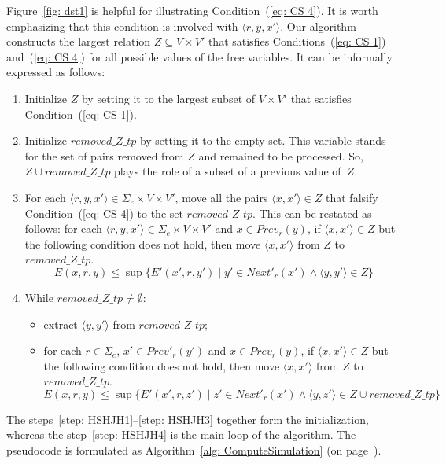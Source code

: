 \documentclass[11pt]{article}
\def\tuple#1{\langle#1\rangle}
\def\eqref#1{(\ref{#1})}
\newcommand{\SE}{\Sigma_e}
\newcommand{\Prev}{\mathit{Prev}}
\newcommand{\NextP}{\mathit{Next}'}
\newcommand{\PrevP}{\mathit{Prev}'}
\newcommand{\removeZ}{\textit{removed\_Z\_tp}}
\begin{document}
Figure~\ref{fig: dst1} is helpful for illustrating Condition~\eqref{eq: CS 4}. It is worth emphasizing that this condition is involved with $\tuple{r,y,x'}$. Our algorithm constructs the largest relation $Z \subseteq V \times V'$ that satisfies Conditions~\eqref{eq: CS 1} and~\eqref{eq: CS 4} for all possible values of the free variables. 
%
It can be informally expressed as follows:
\begin{enumerate}
\item\label{step: HSHJH1} Initialize $Z$ by setting it to the largest subset of $V \times V'$ that satisfies Condition~\eqref{eq: CS 1}. 
\item Initialize $\removeZ$ by setting it to the empty set. This variable stands for the set of pairs removed from $Z$ and remained to be processed. So, $Z \cup \removeZ$ plays the role of a subset of a previous value of~$Z$. 

\item\label{step: HSHJH3} For each $\tuple{r,y,x'} \in \SE \times V \times V'$, move all the pairs $\tuple{x,x'} \in Z$ that falsify Condition~\eqref{eq: CS 4} to the set $\removeZ$. This can be restated as follows: for each $\tuple{r,y,x'} \in \SE \times V \times V'$ and $x \in \Prev_r(y)$, if $\tuple{x,x'} \in Z$ but the following condition does not hold, then move $\tuple{x,x'}$ from $Z$ to $\removeZ$. 
\begin{equation}\label{eq: CS 5}
E(x,r,y) \leq \sup \{E'(x',r,y') \mid y' \in \NextP_r(x') \land \tuple{y,y'} \in Z\}
\end{equation}

\item\label{step: HSHJH4} While $\removeZ \neq \emptyset$: 
	\begin{itemize} 
	\item extract $\tuple{y,y'}$ from $\removeZ$;
	\item for each $r \in \SE$, $x' \in \PrevP_r(y')$ and $x \in \Prev_r(y)$, if $\tuple{x,x'} \in Z$ but the following condition does not hold, then move $\tuple{x,x'}$ from $Z$ to $\removeZ$. 
	\begin{equation}\label{eq: CS 5b}
	E(x,r,y) \leq \sup \{E'(x',r,z') \mid z' \in \NextP_r(x') \land \tuple{y,z'} \in Z \cup \removeZ\}
	\end{equation}
	\end{itemize}
\end{enumerate}  

The steps~\ref{step: HSHJH1}--\ref{step: HSHJH3} together form the initialization, whereas the step~\ref{step: HSHJH4} is the main loop of the algorithm. The pseudocode is formulated as Algorithm~\ref{alg: ComputeSimulation} (on page~\pageref{alg: ComputeSimulation}).
\end{document}
